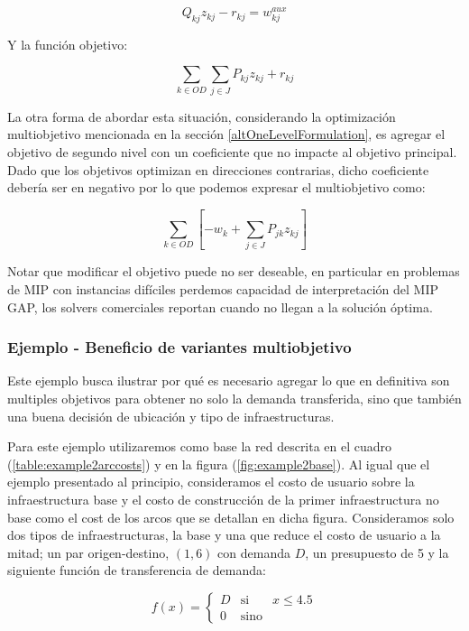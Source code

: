 \documentclass{article}
\begin{document}
  \begin{equation}
    Q_{kj} z_{kj} - r_{kj} = w^{aux}_{kj}
  \end{equation}

  Y la función objetivo:

  \begin{equation}
    \sum_{k \in OD} \sum_{j \in J} P_{kj}z_{kj} + r_{kj}
  \end{equation}

  La otra forma de abordar esta situación, considerando la optimización multiobjetivo mencionada en la sección \ref{altOneLevelFormulation}, es agregar el objetivo de segundo nivel con un coeficiente que no impacte al objetivo principal. Dado que los objetivos optimizan en direcciones contrarias, dicho coeficiente debería ser en negativo por lo que podemos expresar el multiobjetivo como:

  \begin{equation}
      \sum_{k \in OD} \left[ -w_k + \sum_{j \in J} P_{jk}z_{kj} \right]
  \end{equation}

  Notar que modificar el objetivo puede no ser deseable, en particular en problemas de MIP con instancias difíciles perdemos capacidad de interpretación del MIP GAP, los solvers comerciales reportan cuando no llegan a la solución óptima.

  \subsubsection{Ejemplo - Beneficio de variantes multiobjetivo}

  Este ejemplo busca ilustrar por qué es necesario agregar lo que en definitiva son multiples objetivos para obtener no solo la demanda transferida, sino que también una buena decisión de ubicación y tipo de infraestructuras.

  Para este ejemplo utilizaremos como base la red descrita en el cuadro (\ref{table:example2arccosts}) y en la figura (\ref{fig:example2base}). Al igual que el ejemplo presentado al principio, consideramos el costo de usuario sobre la infraestructura base y el costo de construcción de la primer infraestructura no base como el cost de los arcos que se detallan en dicha figura. Consideramos solo dos tipos de infraestructuras, la base y una que reduce el costo de usuario a la mitad; un par origen-destino, $(1, 6)$ con demanda $D$, un presupuesto de 5 y la siguiente función de transferencia de demanda:

  $$
    f(x) = \left\{ \begin{array}{lcr}
            D & \mbox{si}   & x \leq 4.5 \\
            0 & \mbox{sino} &
    \end{array}
    \right.
  $$
\end{document}
